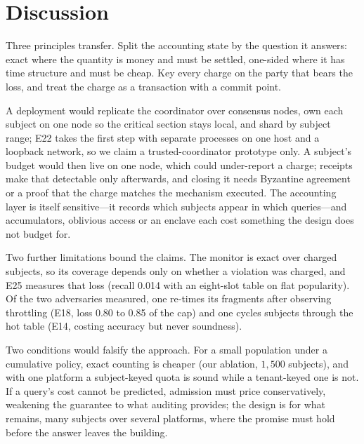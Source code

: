 \section{Discussion}
\label{sec:discussion}

Three principles transfer. Split the accounting state by the question it answers: exact
where the quantity is money and must be settled, one-sided where it has time structure
and must be cheap. Key every charge on the party that bears the loss, and treat the
charge as a transaction with a commit point.

A deployment would replicate the coordinator over consensus nodes, own each subject on
one node so the critical section stays local, and shard by subject range; E22 takes the
first step with separate processes on one host and a loopback network, so we claim a
trusted-coordinator prototype only. A subject's budget would then live on one node, which could under-report a charge;
receipts make that detectable only afterwards, and closing it needs Byzantine agreement
or a proof that the charge matches the mechanism executed. The accounting layer is itself
sensitive---it records which subjects appear in which queries---and accumulators,
oblivious access or an enclave each cost something the design does not budget for.

Two further limitations bound the claims. The monitor is exact over charged subjects, so
its coverage depends only on whether a violation was charged, and E25 measures that loss
(recall 0.014 with an eight-slot table on flat popularity). Of the two adversaries measured, one
re-times its fragments after observing throttling (E18, loss 0.80 to 0.85 of the cap) and
one cycles subjects through the hot table (E14, costing accuracy but never soundness).

Two conditions would falsify the approach. For a small population under a cumulative
policy, exact counting is cheaper (our ablation, $1{,}500$ subjects), and with one
platform a subject-keyed quota is sound while a tenant-keyed one is not. If a query's cost
cannot be predicted, admission must price conservatively, weakening the guarantee to what
auditing provides; the design is for what remains, many subjects over several platforms,
where the promise must hold before the answer leaves the building.

